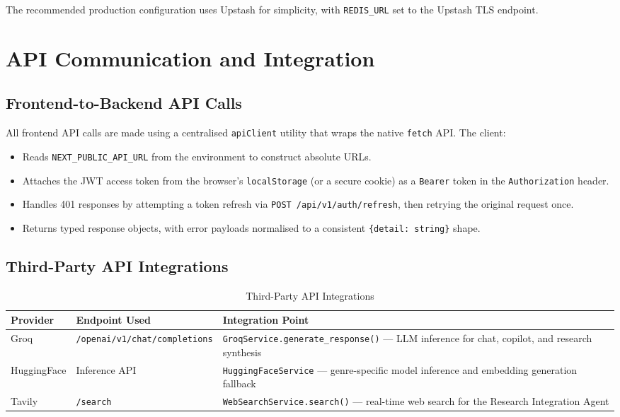 The recommended production configuration uses Upstash for simplicity, with \texttt{REDIS\_URL} set to the Upstash TLS endpoint.

\section{API Communication and Integration}
\label{sec:api-communication}

\subsection{Frontend-to-Backend API Calls}

All frontend API calls are made using a centralised \texttt{apiClient} utility that wraps the native \texttt{fetch} API. The client:

\begin{itemize}
    \item Reads \texttt{NEXT\_PUBLIC\_API\_URL} from the environment to construct absolute URLs.
    \item Attaches the JWT access token from the browser's \texttt{localStorage} (or a secure cookie) as a \texttt{Bearer} token in the \texttt{Authorization} header.
    \item Handles 401 responses by attempting a token refresh via \texttt{POST /api/v1/auth/refresh}, then retrying the original request once.
    \item Returns typed response objects, with error payloads normalised to a consistent \texttt{\{detail: string\}} shape.
\end{itemize}

\subsection{Third-Party API Integrations}

\begin{table}[H]
\centering
\begin{tabular}{|p{3.5cm}|p{3.5cm}|p{6.5cm}|}
\hline
\textbf{Provider} & \textbf{Endpoint Used} & \textbf{Integration Point} \\
\hline
Groq & \texttt{/openai/v1/chat/completions} & \texttt{GroqService.generate\_response()} — LLM inference for chat, copilot, and research synthesis \\
\hline
HuggingFace & Inference API & \texttt{HuggingFaceService} — genre-specific model inference and embedding generation fallback \\
\hline
Tavily & \texttt{/search} & \texttt{WebSearchService.search()} — real-time web search for the Research Integration Agent \\
\hline
\end{tabular}
\caption{Third-Party API Integrations}
\label{tab:third-party-apis}
\end{table}

